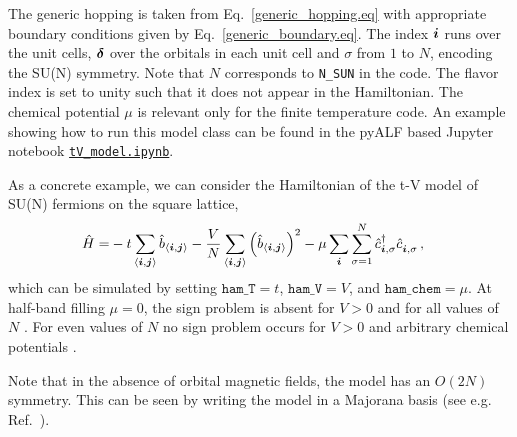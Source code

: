 The generic hopping is taken from Eq.~\eqref{generic_hopping.eq} with appropriate boundary conditions given by Eq.~\eqref{generic_boundary.eq}. The index $\boldsymbol{i}$ runs over the unit cells, $\boldsymbol{\delta}$ over the orbitals in each unit cell and $\sigma$  from $1$ to $N$,  encoding the SU(N) symmetry.
Note that $N$ corresponds to \texttt{N\_SUN}  in the code.
The flavor index is set to unity such that it does not appear in the  Hamiltonian.
The chemical potential $\mu$ is relevant only for the finite temperature code.
An example showing how to run this model class can be found in the pyALF based Jupyter notebook   
\href{https://git.physik.uni-wuerzburg.de/ALF/pyALF/-/blob/master/Notebooks/tV_model.ipynb}{\texttt{tV\_model.ipynb}}.

As a concrete example, we can consider the Hamiltonian of the t-V model of SU(N) fermions on the square lattice,
\begin{align}
\hat{H}= & -t \sum_{\langle \ve{i}, \ve{j} \rangle}  \hat{b}_{\langle \ve{i}, \ve{j} \rangle}
- \frac{V}{N} \sum_{\langle \ve{i}, \ve{j} \rangle}  \left(  \hat{b}_{\langle \ve{i}, \ve{j} \rangle}  \right)^2   - \mu \sum_{\ve{i}}  \sum_{\sigma =1}^{N} \hat{c}^{\dagger}_{\vec{i},\sigma } \hat{c}^{\phantom\dagger}_{\vec{i},\sigma } \,,
\end{align} 
which can be simulated by setting $\texttt{ham\_T}=t$, $\texttt{ham\_V} = V$, and $\texttt{ham\_chem}=\mu$.
At half-band filling $\mu =0$, the sign problem is absent for $V>0$ and for all values of $N$ \cite{Huffman14,Li16}.  For even values of $N$ no sign problem occurs for $V>0$ and arbitrary chemical potentials \cite{Wu04}.   

Note  that  in the absence of orbital magnetic fields,  the model has an $O(2N)$ symmetry. This can be seen by writing the model in a Majorana basis (see e.g. Ref.~\cite{Assaad16}). 








